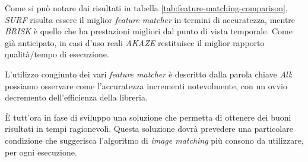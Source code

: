 Come si pu\`o notare dai risultati in tabella \ref{tab:feature-matching-comparison}, \textit{SURF} risulta essere il miglior \textit{feature matcher} in termini di accuratezza, mentre \textit{BRISK} \`e quello che ha prestazioni migliori dal punto di vista temporale. Come gi\`a anticipato, in casi d'uso reali \textit{AKAZE} restituisce il miglior rapporto qualit\`a/tempo di esecuzione.\par
L'utilizzo congiunto dei vari \textit{feature matcher} \`e descritto dalla parola chiave \textit{All}: possiamo osservare come l'accuratezza incrementi notevolmente, con un ovvio decremento dell'efficienza della libreria.\par
\`E tutt'ora in fase di sviluppo una soluzione che permetta di ottenere dei buoni risultati in tempi ragionevoli. Questa soluzione dovr\`a prevedere una particolare condizione che suggerisca l'algoritmo di \textit{image matching} pi\`u consono da utilizzare, per ogni esecuzione.
